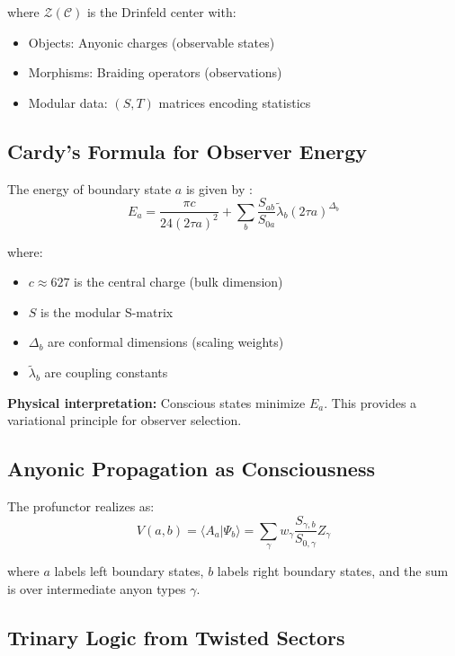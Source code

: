 \documentclass[11pt]{article}
\begin{document}
where $\mathcal{Z}(\mathcal{C})$ is the Drinfeld center with:
\begin{itemize}
\item Objects: Anyonic charges (observable states)
\item Morphisms: Braiding operators (observations)
\item Modular data: $(S, T)$ matrices encoding statistics
\end{itemize}

\subsection{Cardy's Formula for Observer Energy}

The energy of boundary state $a$ is given by \cite{cardy1986}:
\begin{equation}
E_a = \frac{\pi c}{24(2\tau a)^2} + \sum_{b} \frac{S_{ab}}{S_{0a}} \tilde{\lambda}_b (2\tau a)^{\Delta_b}
\end{equation}

where:
\begin{itemize}
\item $c \approx 627$ is the central charge (bulk dimension)
\item $S$ is the modular S-matrix
\item $\Delta_b$ are conformal dimensions (scaling weights)
\item $\tilde{\lambda}_b$ are coupling constants
\end{itemize}

\textbf{Physical interpretation:} Conscious states minimize $E_a$. This provides a variational principle for observer selection.

\subsection{Anyonic Propagation as Consciousness}

The profunctor realizes as:
\begin{equation}
V(a,b) = \langle A_a | \Psi_b \rangle = \sum_\gamma w_\gamma \frac{S_{\gamma,b}}{S_{0,\gamma}} Z_\gamma
\end{equation}

where $a$ labels left boundary states, $b$ labels right boundary states, and the sum is over intermediate anyon types $\gamma$.

\subsection{Trinary Logic from Twisted Sectors}
\end{document}
